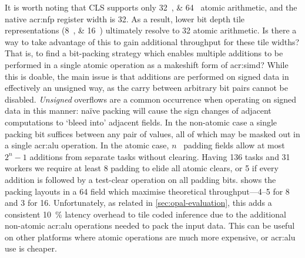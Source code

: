 It is worth noting that CLS supports only \qtylist{32;64}{\bit} atomic arithmetic, and the native \gls{acr:nfp} register width is \qty{32}{\bit}.
As a result, lower bit depth tile representations (\qtylist{8;16}{\bit}) ultimately resolve to \qty{32}{\bit} atomic arithmetic.
Is there a way to take advantage of this to gain additional throughput for these tile widths?
That is, to find a bit-packing strategy which enables multiple additions to be performed in a single atomic operation as a makeshift form of \gls{acr:simd}?
While this is doable, the main issue is that additions are performed on signed data in effectively an unsigned way, as the carry between arbitrary bit pairs cannot be disabled.
\emph{Unsigned} overflows are a common occurrence when operating on signed data in this manner: na\"{i}ve packing will cause the sign changes of adjacent computations to `bleed into' adjacent fields.
In the non-atomic case a single packing bit suffices between any pair of values, all of which may be masked out in a single \gls{acr:alu} operation.
In the atomic case, $n$~\unit{\bit} padding fields allow at most $2^n-1$ additions from separate tasks without clearing.
Having \num{136} tasks and \num{31} workers we require at least \qty{8}{\bit} padding to elide all atomic clears, or \qty{5}{\bit} if every addition is followed by a test-clear operation on all padding bits.
 shows the packing layouts in a \qty{64}{\bit} field which maximise theoretical throughput---\qtyrange{4}{5}{\times} for \qty{8}{\bit} and \qty{3}{\times} for \qty{16}{\bit}.
Unfortunately, as related in \cref{sec:opal-evaluation}, this adds a consistent \qty{10}{\percent} latency overhead to tile coded inference due to the additional non-atomic \gls{acr:alu} operations needed to pack the input data.
This can be useful on other platforms where atomic operations are much more expensive, or \gls{acr:alu} use is cheaper.

